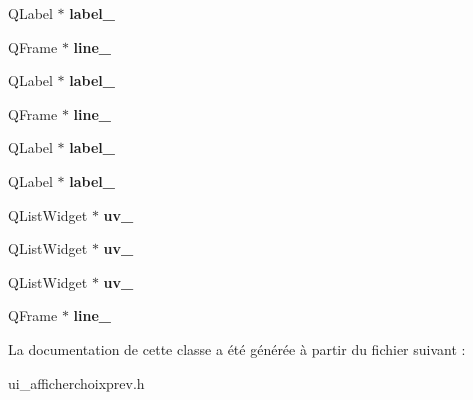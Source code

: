 \begin{DoxyCompactItemize}
\item 
\hypertarget{class_ui__afficherchoixprev_a70e620c66644a82a9ef608a57f611f01}{Q\+Label $\ast$ {\bfseries label\+\_}}\label{class_ui__afficherchoixprev_a70e620c66644a82a9ef608a57f611f01}

\item 
\hypertarget{class_ui__afficherchoixprev_a5b34a9a3d5c5ff0cb229905bcbcf2c8b}{Q\+Frame $\ast$ {\bfseries line\+\_}}\label{class_ui__afficherchoixprev_a5b34a9a3d5c5ff0cb229905bcbcf2c8b}

\item 
\hypertarget{class_ui__afficherchoixprev_a5bd9a8223c27150e8a8cc0ff24c7d00c}{Q\+Label $\ast$ {\bfseries label\+\_}}\label{class_ui__afficherchoixprev_a5bd9a8223c27150e8a8cc0ff24c7d00c}

\item 
\hypertarget{class_ui__afficherchoixprev_ab245c221fae157936a63833e454b3d5f}{Q\+Frame $\ast$ {\bfseries line\+\_}}\label{class_ui__afficherchoixprev_ab245c221fae157936a63833e454b3d5f}

\item 
\hypertarget{class_ui__afficherchoixprev_abda8fda8a1da91974f57aad57ddbea2b}{Q\+Label $\ast$ {\bfseries label\+\_}}\label{class_ui__afficherchoixprev_abda8fda8a1da91974f57aad57ddbea2b}

\item 
\hypertarget{class_ui__afficherchoixprev_a2be4f30a4da5408b9a9cea02a42a3c84}{Q\+Label $\ast$ {\bfseries label\+\_}}\label{class_ui__afficherchoixprev_a2be4f30a4da5408b9a9cea02a42a3c84}

\item 
\hypertarget{class_ui__afficherchoixprev_a8b115b8c98b279d78fb3ad1040c9f6d9}{Q\+List\+Widget $\ast$ {\bfseries uv\+\_}}\label{class_ui__afficherchoixprev_a8b115b8c98b279d78fb3ad1040c9f6d9}

\item 
\hypertarget{class_ui__afficherchoixprev_a2d53964dc35a4645face3abd1e711ca2}{Q\+List\+Widget $\ast$ {\bfseries uv\+\_}}\label{class_ui__afficherchoixprev_a2d53964dc35a4645face3abd1e711ca2}

\item 
\hypertarget{class_ui__afficherchoixprev_a5fba9fe523307277a3b3e9cbba268b51}{Q\+List\+Widget $\ast$ {\bfseries uv\+\_}}\label{class_ui__afficherchoixprev_a5fba9fe523307277a3b3e9cbba268b51}

\item 
\hypertarget{class_ui__afficherchoixprev_af8701f530cc1d58cd59a5a8fef73a1d9}{Q\+Frame $\ast$ {\bfseries line\+\_}}\label{class_ui__afficherchoixprev_af8701f530cc1d58cd59a5a8fef73a1d9}

\end{DoxyCompactItemize}


La documentation de cette classe a été générée à partir du fichier suivant \+:\begin{DoxyCompactItemize}
\item 
ui\+\_\+afficherchoixprev.\+h\end{DoxyCompactItemize}
